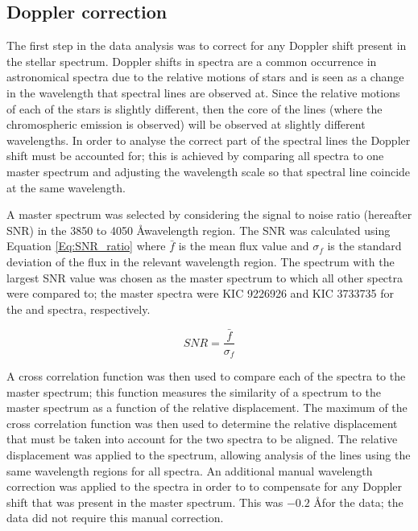 \subsection{Doppler correction}
\label{Chp4_data_analysis_doppler}
The first step in the data analysis was to correct for any Doppler shift present in the stellar spectrum. Doppler shifts in spectra are a common occurrence in astronomical spectra due to the relative motions of stars and is seen as a change in the wavelength that spectral lines are observed at. Since the relative motions of each of the stars is slightly different, then the core of the \caII lines (where the chromospheric emission is observed) will be observed at slightly different wavelengths. In order to analyse the correct part of the spectral lines the Doppler shift must be accounted for; this is achieved by comparing all spectra to one master spectrum and adjusting the wavelength scale so that spectral line coincide at the same wavelength.

A master spectrum was selected by considering the signal to noise ratio (hereafter SNR) in the 3850 to 4050 \AA wavelength region. The SNR was calculated using Equation \ref{Eq:SNR_ratio} where $\bar{f}$ is the mean flux value and $\sigma_{f}$ is the standard deviation of the flux in the relevant wavelength region. The spectrum with the largest SNR value was chosen as the master spectrum to which all other spectra were compared to; the master spectra were KIC 9226926 and KIC 3733735 for the \narval and \esp spectra, respectively.

\begin{equation}
SNR = \frac{\bar{f}}{\sigma_{f}}
\label{Eq:SNR_ratio}
\end{equation}

A cross correlation function was then used to compare each of the spectra to the master spectrum; this function measures the similarity of a spectrum to the master spectrum as a function of the relative displacement. The maximum of the cross correlation function was then used to determine the relative displacement that must be taken into account for the two spectra to be aligned. The relative displacement was applied to the spectrum, allowing analysis of the \caII lines using the same wavelength regions for all spectra. An additional manual wavelength correction was applied to the spectra in order to to compensate for any Doppler shift that was present in the master spectrum. This was $-0.2$ \space \AA for the \esp data; the \narval data did not require this manual correction.

